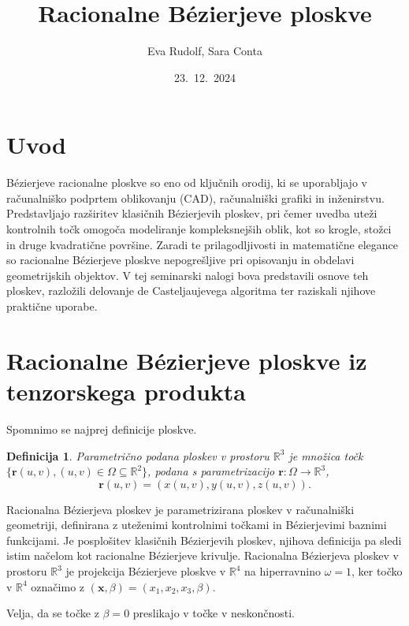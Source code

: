 \documentclass[a4paper,10pt]{article}
\title{Racionalne Bézierjeve ploskve}
\author{Eva Rudolf, Sara Conta}
\date{23.\ 12.\ 2024}
\newtheorem{definicija}{Definicija}
\begin{document}
\maketitle

\newpage

\section{Uvod}

Bézierjeve racionalne ploskve so eno od ključnih orodij, ki se uporabljajo v računalniško podprtem oblikovanju (CAD), računalniški grafiki in inženirstvu. Predstavljajo razširitev klasičnih Bézierjevih ploskev, pri čemer uvedba uteži kontrolnih točk omogoča modeliranje kompleksnejših oblik, kot so krogle, stožci in druge kvadratične površine. Zaradi te prilagodljivosti in matematične elegance so racionalne Bézierjeve ploskve nepogrešljive pri opisovanju in obdelavi geometrijskih objektov. V tej seminarski nalogi bova predstavili osnove teh ploskev, razložili delovanje de Casteljaujevega algoritma ter raziskali njihove praktične uporabe.

\section{Racionalne Bézierjeve ploskve iz tenzorskega produkta}

Spomnimo se najprej definicije ploskve.

\begin{definicija}
    Parametrično podana ploskev v prostoru $\mathbb{R} ^ 3$ je množica točk $ \{ \textbf{r} (u,v), (u,v) \in \Omega \subseteq \mathbb{R}^2 \} $, podana s parametrizacijo $\mathbf{r} : \Omega \rightarrow \mathbb{R}^3$, 
    $$
    \mathbf{r} (u,v) = (x(u,v), y(u,v), z(u,v)).
    $$
\end{definicija}

Racionalna Bézierjeva ploskev je parametrizirana ploskev v računalniški geometriji, definirana z uteženimi kontrolnimi točkami in Bézierjevimi baznimi funkcijami. Je posplošitev klasičnih Bézierjevih ploskev, njihova definicija pa sledi istim načelom kot racionalne Bézierjeve krivulje. Racionalna Bézierjeva ploskev v prostoru $\mathbb{R}^3$ je projekcija Bézierjeve ploskve v $\mathbb{R}^4$ na hiperravnino $\omega = 1$, ker točko v $\mathbb{R}^4$ označimo z $(\mathbf{x}, \beta) = (x_1, x_2, x_3, \beta)$.

Velja, da se točke z $\beta = 0$ preslikajo v točke v neskončnosti.
\end{document}
